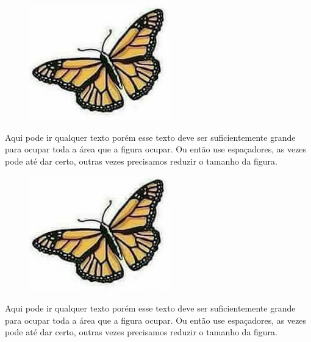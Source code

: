 \documentclass[a4paper,11pt]{article}
\begin{document}
\begin{minipage}{\textwidth}
	\vspace{5pt}
	\begin{figure}
		\vspace{-\baselineskip}
		\includegraphics[width=0.7\linewidth]{imagens/exemplo.jpg} 
	\end{figure}
	Aqui pode ir qualquer texto porém esse texto deve ser suficientemente grande para ocupar toda a área que a figura ocupar. Ou então use espaçadores, as vezes pode até dar certo, outras vezes precisamos reduzir o tamanho da figura.
\end{minipage}

\begin{minipage}{\textwidth}
	\vspace{5pt}
	\begin{figure}
		\vspace{-\baselineskip}
		\includegraphics[width=0.7\linewidth]{imagens/exemplo.jpg} 
	\end{figure}
	Aqui pode ir qualquer texto porém esse texto deve ser suficientemente grande para ocupar toda a área que a figura ocupar. Ou então use espaçadores, as vezes pode até dar certo, outras vezes precisamos reduzir o tamanho da figura. \\[3mm]
\end{minipage}
\end{document}
